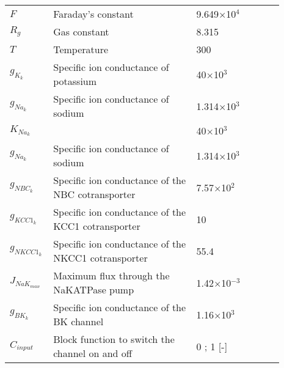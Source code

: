 \documentclass[fleqn]{report}
\numberwithin{equation}{section}
\numberwithin{equation}{section}
\begin{document}
%
%
%
\begin{table}[h!]
\centering
\begin{tabular}{ p{0.09\linewidth}  >{\footnotesize} p{0.5\linewidth}  >{\footnotesize} p{0.27\linewidth} >{\footnotesize} p{0.03\linewidth} }
\hline	
$F$ 			& Faraday's constant														& 9.649$\times$10$^4$ \Cmol 	& \\
$R_g$ 			& Gas constant 															& 8.315 \JmolK		& \\
$T$ 	    	& Temperature 															& 300 \Kelvin		& \\
$g_{K_{k}}$ 	& Specific ion conductance of potassium 								& 40$\times$10$^3$ \perOhmm 		& \cite{Ostby2009}  \\
$g_{Na_k}$ 		& Specific ion conductance of sodium 									& 1.314$\times$10$^3$  \perOhmm 	& \cite{Ostby2009}  \\
$K_{Na_k}$ 	& 								& 40$\times$10$^3$ \perOhmm 		& \cite{Ostby2009}  \\
$g_{Na_k}$ 		& Specific ion conductance of sodium 									& 1.314$\times$10$^3$  \perOhmm 	& \cite{Ostby2009}  \\
$g_{NBC_k}$ 	& Specific ion conductance of the NBC cotransporter						& 7.57$\times$10$^2$ \perOhmm 	& \cite{Ostby2009}  \\
$g_{KCC1_k}$ 	& Specific ion conductance of the KCC1 cotransporter					& 10 \perOhmm 	& \cite{Ostby2009}  \\
$g_{NKCC1_k}$ 	& Specific ion conductance of the NKCC1 cotransporter	 				& 55.4 \perOhmm 	& \cite{Ostby2009}  \\
$J_{NaK_{max}}$ & Maximum flux through the NaKATPase pump							& 1.42$\times$10$^{-3}$ \uMms 	& \cite{Ostby2009}  \\
$g_{BK_k}$ 		& Specific ion conductance of the BK channel							& 1.16$\times$10$^3$   \perOhmm & \cite{GonzalezFernandez1994}  \\
$C_{input}$  & Block function to switch the channel on and off &  0 ; 1 [-] 			&  \\
\hline
\end{tabular}
\end{table}
\end{document}
